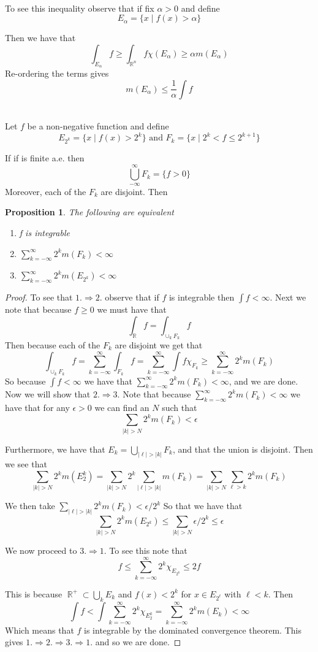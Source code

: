 \documentclass{article}
\DeclareMathOperator{\R}{\mathbb{R}}
\DeclareMathOperator{\suchthat}{\mathrel{|}}
\newcommand{\problem}[1]{\noindent{\textbf{Problem #1}}\\}
\newtheorem*{prop}{Proposition}
\begin{document}
\problem{2.5.9} To see this inequality observe that if fix $\alpha > 0$ and define 
\[
E_\alpha = \{x \suchthat f(x) > \alpha\}
\]

Then we have that
\[
\int_{E_\alpha} f \geq \int_{\R^n} f\chi(E_\alpha) \geq \alpha m(E_\alpha) 
\]
Re-ordering the terms gives
\[
m(E_\alpha) \leq \frac{1}{\alpha}\int f
\]

\problem{2.5.10} Let $f$ be a non-negative function and define 
\[
E_{2^k} = \{x \suchthat f(x) > 2^k\} \text{ and } F_k = \{x \suchthat 2^k < f \leq 2^{k+1}\}
\]

If if is finite a.e. then 
\[
\bigcup_{-\infty}^\infty F_k = \{f > 0\}
\]
Moreover, each of the $F_k$ are disjoint. Then \\
\begin{prop}
The following are equivalent
\begin{enumerate}
\item f is integrable
\item $\sum_{k= -\infty}^\infty 2^km(F_k) < \infty$
\item $\sum_{k= -\infty}^\infty 2^km(E_{2^k}) < \infty$
\end{enumerate}
\end{prop}
\begin{proof}
To see that $1. \Rightarrow 2.$ observe that if $f$ is integrable then $\int f < \infty$. Next we note that because $f \geq 0$ we must have that 
\[
\int_{\R} f = \int_{\cup_k F_k} f
\]
Then because each of the $F_k$ are disjoint we get that 
\[
\int_{\cup_k F_k} f = \sum_{k = -\infty}^\infty \int_{F_k} f = \sum_{k = -\infty}^\infty \int f\chi_{F_k} \geq \sum_{k = -\infty}^\infty 2^km(F_k)
\]
So because $\int f < \infty$ we have that $\sum_{k=-\infty}^\infty 2^km(F_k) < \infty$, and we are done. Now we will show that $2. \Rightarrow 3.$ Note that because $\sum_{k=-\infty}^\infty 2^km(F_k) < \infty$ we have that for any $\epsilon > 0$ we can find an $N$ such that 
\[
\sum_{|k| > N} 2^km(F_k) < \epsilon
\]

Furthermore, we have that $E_k = \bigcup_{|\ell| > |k|} F_k$, and that the union is disjoint. Then we see that
\[
\sum_{|k| > N} 2^km(E_2^k) = \sum_{|k| > N} 2^{k}\sum_{|\ell| > |k|} m(F_k) = \sum_{|k| > N}\sum_{\ell > k} 2^km(F_k)
\]

We then take $\sum_{|\ell| > |k|} 2^km(F_k) < \epsilon/2^k$ So that we have that
\[
\sum_{|k| > N} 2^km(E_{2^k}) \leq \sum_{|k| > N} \epsilon/2^k \leq \epsilon 
\]

We now proceed to $3. \Rightarrow 1.$ To see this note that 
\[
f \leq \sum_{k = -\infty}^\infty 2^k\chi_{E_{2^k}} \leq 2f
\]

This is because $\R^+ \subset \bigcup_k E_k$ and $f(x) < 2^{k}$ for $x \in E_{2^\ell}$ with $\ell < k$. Then 
\[
\int f < \int \sum_{k = -\infty}^\infty2^k\chi_{E_2^k}  = \sum_{k=-\infty}^\infty 2^km(E_k) < \infty
\]
Which means that $f$ is integrable by the dominated convergence theorem. This gives $1. \Rightarrow 2. \Rightarrow 3. \Rightarrow 1.$ and so we are done. 
\end{proof}
\end{document}
